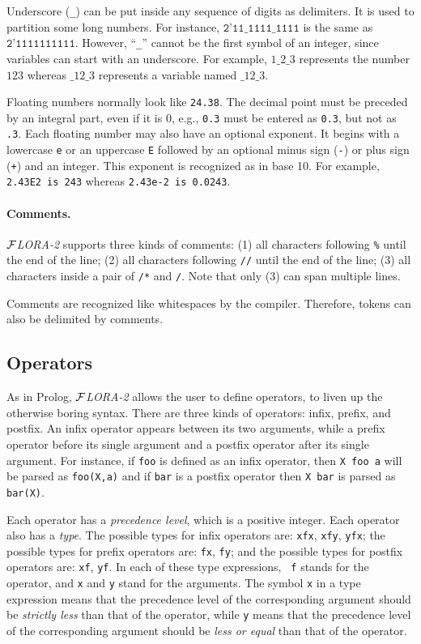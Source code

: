 \documentclass[11pt]{article}
\newcommand{\FLORA}{{\mbox{${\cal F}${\small\it LORA}\rm\emph{-2}}}\xspace}
\begin{document}
Underscore (\texttt{\_}) can be put inside any sequence of digits as
delimiters. It is used to partition some long numbers. For instance,
$\texttt{2'11\_1111\_1111}$ is the same as $\texttt{2'1111111111}$.
However, ``\texttt{\_}'' cannot be the first symbol of an integer, since
variables can start with an underscore. For example, $1\_2\_3$ represents
the number $123$ whereas $\_12\_3$ represents a variable named $\_12\_3$.

Floating numbers normally look like {\tt 24.38}. The decimal point
must be preceded by an integral part, even if it is 0, e.g., {\tt 0.3}
must be entered as {\tt 0.3}, but not as {\tt .3}. Each floating
number may also have an optional exponent. It begins with a lowercase
{\tt e} or an uppercase {\tt E} followed by an optional minus sign
({\tt -}) or plus sign ({\tt +}) and an integer. This exponent is
recognized as in base 10. For example,
\mbox{\tt 2.43E2 is 243} whereas
\mbox{\tt 2.43e-2 is 0.0243}.

\paragraph{Comments.}

%
\FLORA supports three kinds of comments: (1) all characters following
{\tt \%} until the end of the line; (2) all characters following
{\tt //} until the end of the line; (3) all characters inside a pair of
{\tt /*} and {\tt */}. Note that only (3) can span multiple lines.

Comments are recognized like whitespaces by the compiler.  Therefore,
tokens can also be delimited by comments.


\subsection{Operators}


As in Prolog, \FLORA allows the user to define operators, to liven up the
otherwise boring syntax.  There are three kinds of operators: infix,
prefix, and postfix. An infix operator appears between its two arguments,
while a prefix operator before its single argument and a postfix operator
after its single argument. For instance, if {\tt foo} is defined as an
infix operator, then {\tt X foo a} will be parsed as {\tt foo(X,a)} and if
{\tt bar} is a postfix operator then {\tt X bar} is parsed as {\tt bar(X)}. 

%
Each operator has a \emph{precedence level}, which is a positive integer.
Each operator also has a \emph{type}. The possible types for infix operators
are: {\tt xfx}, {\tt xfy}, {\tt yfx}; the possible types for prefix
operators are: {\tt fx}, {\tt fy}; and the possible types for postfix
operators are: {\tt xf}, {\tt yf}. In each of these type expressions, {\tt
  f} stands for the operator, and {\tt x} and {\tt y} stand for the
arguments.  The symbol {\tt x} in a type expression means that the
precedence level of the corresponding argument should be \emph{strictly
  less} than that of the operator, while {\tt y} means that the precedence
level of the corresponding argument should be \emph{less or equal} than
that of the operator.
\end{document}
